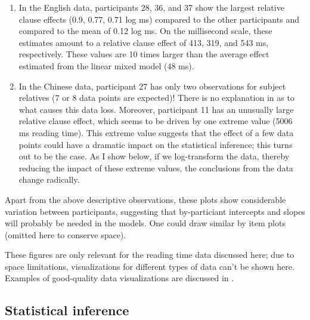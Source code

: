 \documentclass{ar-1col}\usepackage[]{graphicx}\usepackage[]{color}
\begin{document}
\begin{enumerate}
\item In the English data, participants 28, 36, and 37 show the largest relative clause effects (0.9, 0.77, 0.71 log ms) compared to the other participants and compared to the mean of 0.12 log ms. On the millisecond scale, these estimates amount to a relative clause effect of 413, 319, and 543 ms, respectively. These values are 10 times larger than the average effect estimated from the linear mixed model (48 ms).
\item In the Chinese data, participant 27 has only two observations for subject relatives (7 or 8 data points are expected)! There is no explanation in \citet{gibsonwu} as to what causes this data loss.  Moreover, participant 11 has an unusually large relative clause effect, which seems to be driven by one extreme value (5006 ms reading time). This extreme value suggests that the effect of a few data points could have a dramatic impact on the statistical inference; this turns out to be the case. As I show below, if we log-transform the data, thereby reducing the impact of these extreme values, the conclusions from the data change radically.
\end{enumerate}

Apart from the above descriptive observations, these plots show considerable variation between participants, suggesting that by-particiant intercepts and slopes will probably be needed in the models. One could draw similar by item plots (omitted here to conserve space).

These figures are only relevant for the reading time data discussed here; due to space limitations, visualizations for different types of data can't be shown here. Examples of good-quality data visualizations are discussed in \citet{wilke}.

\subsection{Statistical inference}
\end{document}
